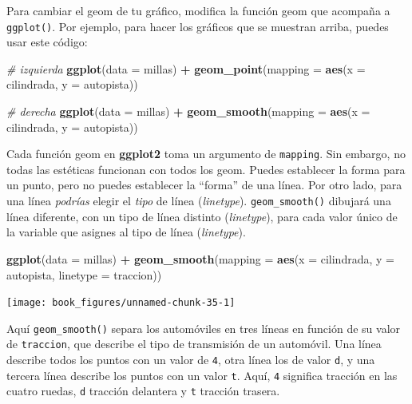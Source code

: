 \documentclass[11pt,oneside]{report}
\newenvironment{Shaded}{\begin{snugshade}}{\end{snugshade}}
\newcommand{\CommentTok}[1]{\textcolor[rgb]{0.56,0.35,0.01}{\textit{#1}}}
\newcommand{\DataTypeTok}[1]{\textcolor[rgb]{0.13,0.29,0.53}{#1}}
\newcommand{\KeywordTok}[1]{\textcolor[rgb]{0.13,0.29,0.53}{\textbf{#1}}}
\newcommand{\NormalTok}[1]{#1}
\newcommand{\OperatorTok}[1]{\textcolor[rgb]{0.81,0.36,0.00}{\textbf{#1}}}
\newcommand{\StringTok}[1]{\textcolor[rgb]{0.31,0.60,0.02}{#1}}
\begin{document}
Para cambiar el geom de tu gráfico, modifica la función geom que
acompaña a \texttt{ggplot()}. Por ejemplo, para hacer los gráficos que
se muestran arriba, puedes usar este código:

\begin{Shaded}
\begin{Highlighting}[]
\CommentTok{# izquierda}
\KeywordTok{ggplot}\NormalTok{(}\DataTypeTok{data =}\NormalTok{ millas) }\OperatorTok{+}
\StringTok{  }\KeywordTok{geom_point}\NormalTok{(}\DataTypeTok{mapping =} \KeywordTok{aes}\NormalTok{(}\DataTypeTok{x =}\NormalTok{ cilindrada, }\DataTypeTok{y =}\NormalTok{ autopista))}

\CommentTok{# derecha}
\KeywordTok{ggplot}\NormalTok{(}\DataTypeTok{data =}\NormalTok{ millas) }\OperatorTok{+}
\StringTok{  }\KeywordTok{geom_smooth}\NormalTok{(}\DataTypeTok{mapping =} \KeywordTok{aes}\NormalTok{(}\DataTypeTok{x =}\NormalTok{ cilindrada, }\DataTypeTok{y =}\NormalTok{ autopista))}
\end{Highlighting}
\end{Shaded}

Cada función geom en \textbf{ggplot2} toma un argumento de
\texttt{mapping}. Sin embargo, no todas las estéticas funcionan con
todos los geom. Puedes establecer la forma para un punto, pero no puedes
establecer la ``forma'' de una línea. Por otro lado, para una línea
\emph{podrías} elegir el \emph{tipo} de línea (\emph{linetype}).
\texttt{geom\_smooth()} dibujará una línea diferente, con un tipo de
línea distinto (\emph{linetype}), para cada valor único de la variable
que asignes al tipo de línea (\emph{linetype}).

\begin{Shaded}
\begin{Highlighting}[]
\KeywordTok{ggplot}\NormalTok{(}\DataTypeTok{data =}\NormalTok{ millas) }\OperatorTok{+}
\StringTok{  }\KeywordTok{geom_smooth}\NormalTok{(}\DataTypeTok{mapping =} \KeywordTok{aes}\NormalTok{(}\DataTypeTok{x =}\NormalTok{ cilindrada, }\DataTypeTok{y =}\NormalTok{ autopista, }\DataTypeTok{linetype =}\NormalTok{ traccion))}
\end{Highlighting}
\end{Shaded}

\begin{center}\texttt{[image: book\_figures/unnamed-chunk-35-1]} \end{center}

Aquí \texttt{geom\_smooth()} separa los automóviles en tres líneas en
función de su valor de \texttt{traccion}, que describe el tipo de
transmisión de un automóvil. Una línea describe todos los puntos con un
valor de \texttt{4}, otra línea los de valor \texttt{d}, y una tercera
línea describe los puntos con un valor \texttt{t}. Aquí, \texttt{4}
significa tracción en las cuatro ruedas, \texttt{d} tracción delantera y
\texttt{t} tracción trasera.
\end{document}
